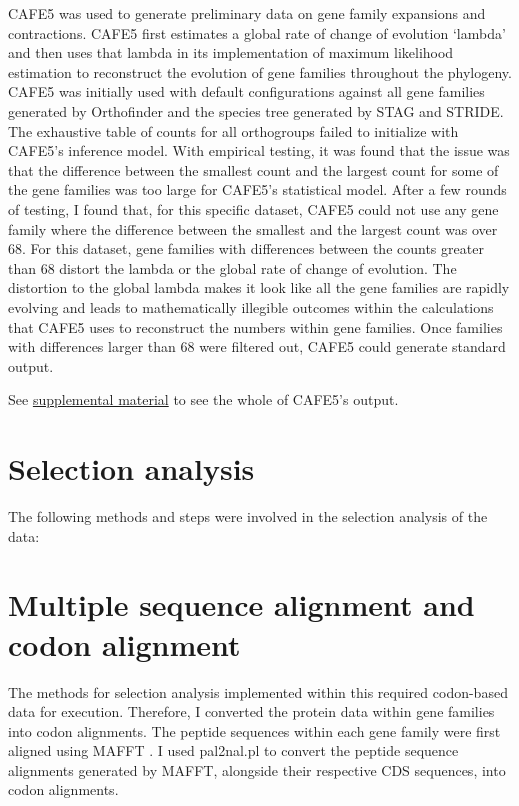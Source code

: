 CAFE5 \cite{Mendes2020-gm} was used to generate preliminary data on gene family expansions and contractions. CAFE5 first estimates a global rate of change of evolution ‘lambda’ and then uses that lambda in its implementation of maximum likelihood estimation to reconstruct the evolution of gene families throughout the phylogeny. CAFE5 was initially used with default configurations against all gene families generated by Orthofinder and the species tree generated by STAG and STRIDE. The exhaustive table of counts for all orthogroups failed to initialize with CAFE5's inference model. With empirical testing, it was found that the issue was that the difference between the smallest count and the largest count for some of the gene families was too large for CAFE5's statistical model. After a few rounds of testing, I found that, for this specific dataset, CAFE5 could not use any gene family where the difference between the smallest and the largest count was over 68. For this dataset, gene families with differences between the counts greater than 68 distort the lambda or the global rate of change of evolution. The distortion to the global lambda makes it look like all the gene families are rapidly evolving and leads to mathematically illegible outcomes within the calculations that CAFE5 uses to reconstruct the numbers within gene families. Once families with differences larger than 68 were filtered out, CAFE5 could generate standard output. 

See \href{https://uah0-my.sharepoint.com/:f:/g/personal/rrd0009_uah_edu/Ei4yllknzK1Pnpm-hP94YRwBiYsHdd3LY2wt4RsgAav8Fg?e=CjITze}{supplemental material} to see the whole of CAFE5’s output.

\section{Selection analysis}

The following methods and steps were involved in the selection analysis of the data:

\section{Multiple sequence alignment and codon alignment}

The methods for selection analysis implemented within this required codon-based data for execution. Therefore, I converted the protein data within gene families into codon alignments. The peptide sequences within each gene family were first aligned using MAFFT \cite{Katoh2002-oe}. I used pal2nal.pl\cite{Suyama2006-xo} to convert the peptide sequence alignments generated by MAFFT, alongside their respective CDS sequences, into codon alignments.

